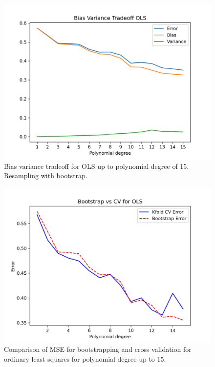 \documentclass{article}
\begin{document}
\begin{figure}[htbp]
    \centering
    \includegraphics[width=\textwidth*2/3]{Project1/figures/Terrain/Bias_Variance_Tradeoff_OLS_15.png}
    \caption{Bias variance tradeoff for OLS up to polynomial degree of 15. Resampling with bootstrap.}
    \label{fig:TerrainBVtradeoff}
\end{figure}


\begin{figure}[htbp]
    \centering
    \includegraphics[width=\textwidth*2/3]{Project1/figures/Terrain/Bias_vs_Var_OLS_15.png}
    \caption{Comparison of MSE for bootstrapping and cross validation for ordinary least squares for polynomial degree up to 15.}
    \label{fig:TerrainBvsCV}
\end{figure}
\end{document}
